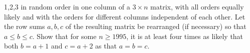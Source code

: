 1,2,3 in random order in one column of a $3 \times n$ matrix, with
all orders equally likely and with the orders for different columns
independent of each other. Let the row sums $a,b,c$ of the resulting
matrix be rearranged (if necessary) so that $a \leq b \leq c$. Show
that for some $n \geq 1995$, it is at least four times as likely that
both $b=a+1$ and $c=a+2$ as that $a=b=c$.
